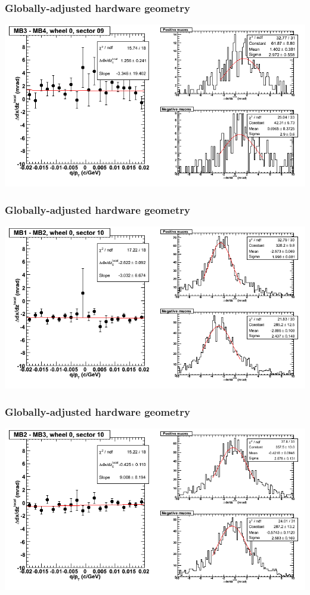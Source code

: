 \documentclass[compress]{beamer}
\begin{document}
\begin{frame}
\frametitle{Globally-adjusted hardware geometry}
\includegraphics[width=\linewidth]{NOV4_segdiffs_HW/dt13_slope_C_09_34.png}
\end{frame}

\begin{frame}
\frametitle{Globally-adjusted hardware geometry}
\includegraphics[width=\linewidth]{NOV4_segdiffs_HW/dt13_slope_C_10_12.png}
\end{frame}

\begin{frame}
\frametitle{Globally-adjusted hardware geometry}
\includegraphics[width=\linewidth]{NOV4_segdiffs_HW/dt13_slope_C_10_23.png}
\end{frame}
\end{document}
